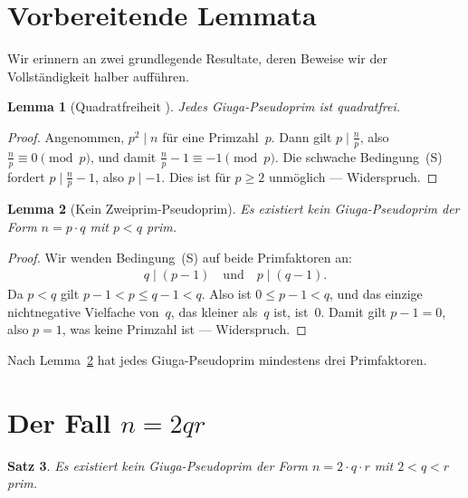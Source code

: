 \documentclass[12pt,a4paper]{amsart}
\newtheorem{theorem}{Satz}[section]
\newtheorem{lemma}[theorem]{Lemma}
\theoremstyle{definition}
\begin{document}
\section{Vorbereitende Lemmata}

Wir erinnern an zwei grundlegende Resultate, deren Beweise wir der Vollständigkeit
halber aufführen.

\begin{lemma}[Quadratfreiheit {\cite{Giuga1950, Borwein1996}}]
\label{lem:qfrei}
Jedes Giuga-Pseudoprim ist quadratfrei.
\end{lemma}

\begin{proof}
Angenommen, $p^2 \mid n$ für eine Primzahl~$p$. Dann gilt $p \mid \tfrac{n}{p}$, also
$\tfrac{n}{p} \equiv 0 \pmod{p}$, und damit $\tfrac{n}{p} - 1 \equiv -1 \pmod{p}$.
Die schwache Bedingung~(S) fordert $p \mid \tfrac{n}{p} - 1$, also $p \mid {-1}$.
Dies ist für $p \ge 2$ unmöglich — Widerspruch.
\end{proof}

\begin{lemma}[Kein Zweiprim-Pseudoprim]
\label{lem:zweiprim}
Es existiert kein Giuga-Pseudoprim der Form $n = p \cdot q$ mit $p < q$ prim.
\end{lemma}

\begin{proof}
Wir wenden Bedingung~(S) auf beide Primfaktoren an:
\begin{align*}
  q \mid (p - 1) \quad\text{und}\quad p \mid (q - 1).
\end{align*}
Da $p < q$ gilt $p - 1 < p \le q - 1 < q$.
Also ist $0 \le p - 1 < q$, und das einzige nichtnegative Vielfache von~$q$,
das kleiner als~$q$ ist, ist~$0$. Damit gilt $p - 1 = 0$, also $p = 1$,
was keine Primzahl ist — Widerspruch.
\end{proof}

Nach Lemma~\ref{lem:zweiprim} hat jedes Giuga-Pseudoprim mindestens drei Primfaktoren.

\section{Der Fall \texorpdfstring{$n = 2qr$}{n = 2qr}}
\label{sec:gerade}

\begin{theorem}
\label{thm:2qr}
Es existiert kein Giuga-Pseudoprim der Form $n = 2 \cdot q \cdot r$
mit $2 < q < r$ prim.
\end{theorem}
\end{document}
